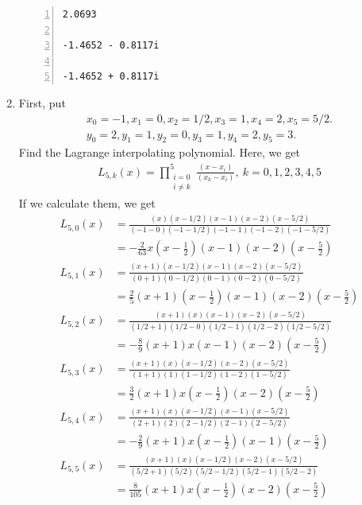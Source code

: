 \documentclass{article}
\begin{document}
\begin{enumerate}
\begin{lstlisting}[frame=single, numbers=left, style=Matlab-editor]
2.0693

-1.4652 - 0.8117i

-1.4652 + 0.8117i

        \end{lstlisting}
    
    \item First, put
    \begin{align}
        x_0 = -1, x_1 = 0, x_2 = 1/2, x_3 = 1, x_4 = 2, x_5 = 5/2.
        \\
        y_0 = 2, y_1 = 1, y_2 = 0, y_3 = 1, y_4 = 2, y_5 = 3.
    \end{align}
    Find the Lagrange interpolating polynomial. Here, we get
    \begin{align}
        L_{5, k}(x) = \prod_{\substack{i = 0 \\ i \neq k}}^{5} \frac{(x-x_i)}{(x_k - x_i)}, \ k = 0, 1, 2, 3, 4, 5
    \end{align}
    If we calculate them, we get
    \begin{align*}
        L_{5, 0}(x) & = \frac{(x)(x-1/2)(x-1)(x-2)(x-5/2)}{(-1-0)(-1-1/2)(-1-1)(-1-2)(-1-5/2)}
        \\
        & = -\frac{2}{63}x(x-\frac{1}{2})(x-1)(x-2)(x-\frac{5}{2})
        \\
        L_{5, 1}(x) & = \frac{(x+1)(x-1/2)(x-1)(x-2)(x-5/2)}{(0+1)(0-1/2)(0-1)(0-2)(0-5/2)}
        \\
        & = \frac{2}{5}(x+1)(x-\frac{1}{2})(x-1)(x-2)(x-\frac{5}{2})
        \\
        L_{5, 2}(x) & = \frac{(x+1)(x)(x-1)(x-2)(x-5/2)}{(1/2+1)(1/2-0)(1/2-1)(1/2-2)(1/2-5/2)}
        \\
        & = -\frac{8}{9}(x+1)x(x-1)(x-2)(x-\frac{5}{2})
        \\
        L_{5, 3}(x) & = \frac{(x+1)(x)(x-1/2)(x-2)(x-5/2)}{(1+1)(1)(1-1/2)(1-2)(1-5/2)}
        \\
        & = \frac{3}{2}(x+1)x(x-\frac{1}{2})(x-2)(x-\frac{5}{2})
        \\
        L_{5, 4}(x) & = \frac{(x+1)(x)(x-1/2)(x-1)(x-5/2)}{(2+1)(2)(2-1/2)(2-1)(2-5/2)}
        \\
        & = -\frac{2}{9}(x+1)x(x-\frac{1}{2})(x-1)(x-\frac{5}{2})
        \\
        L_{5, 5}(x) & = \frac{(x+1)(x)(x-1/2)(x-2)(x-5/2)}{(5/2+1)(5/2)(5/2-1/2)(5/2-1)(5/2-2)}
        \\
        & = \frac{8}{105}(x+1)x(x-\frac{1}{2})(x-2)(x-\frac{5}{2})
    \end{align*}

\end{enumerate}
\end{document}
